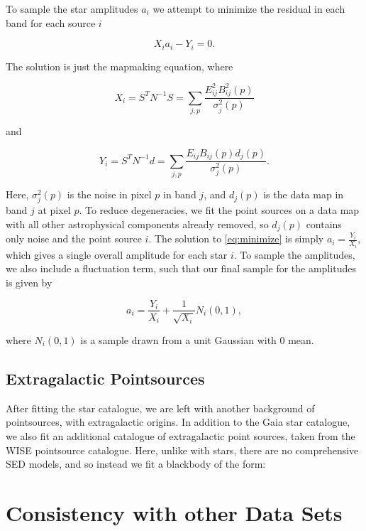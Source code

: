 \documentclass{aa}
\begin{document}
To sample the star amplitudes $a_i$ we attempt to minimize the residual in each band for each source $i$

\begin{equation}
\label{eq:minimize}
X_ia_i - Y_i = 0.
\end{equation}

The solution is just the mapmaking equation, where

\begin{equation}
X_i = S^T N^{-1} S = \sum_{j,p}\frac{E_{ij}^2 B^2_{ij}(p)}{\sigma_j^2(p)} 
\end{equation}

and

\begin{equation}
Y_i = S^TN^{-1}d = \sum_{j,p} \frac{E_{ij}B_{ij}(p) d_j(p)}{\sigma_j^2(p)}.
\end{equation}

Here, $\sigma_j^2(p)$ is the noise in pixel $p$ in band $j$, and $d_j(p)$ is the data map in band $j$ at pixel $p$. To reduce degeneracies, we fit the point sources on a data map with all other astrophysical components already removed, so $d_j(p)$ contains only noise and the point source $i$. The solution to \ref{eq:minimize} is simply $a_i = \frac{Y_i}{X_i}$, which gives a single overall amplitude for each star $i$. To sample the amplitudes, we also include a fluctuation term, such that our final sample for the amplitudes is given by

\begin{equation}
a_i = \frac{Y_i}{X_i} + \frac{1}{\sqrt{X_i}} N_i(0,1),
\end{equation}

where $N_i(0,1)$ is a sample drawn from a unit Gaussian with 0 mean.

\subsection{Extragalactic Pointsources}

After fitting the star catalogue, we are left with another background of pointsources, with extragalactic origins. In addition to the Gaia star catalogue, we also fit an additional catalogue of extragalactic point sources, taken from the WISE pointsource catalogue. Here, unlike with stars, there are no comprehensive SED models, and so instead we fit a blackbody of the form:

\section{Consistency with other Data Sets}
\label{sec:consistency}
\end{document}
